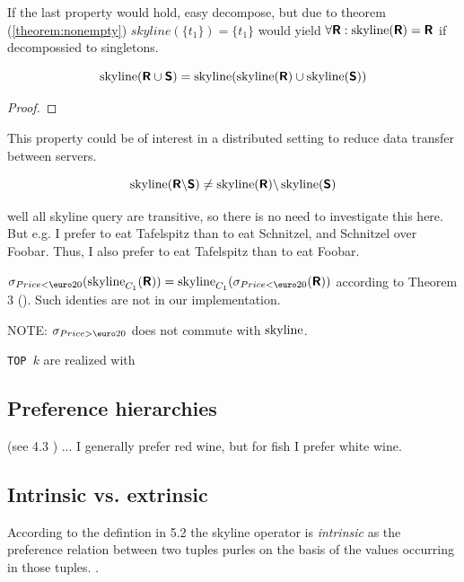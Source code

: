 If the last property would hold, easy decompose, but due to theorem (\ref{theorem:nonempty}) $skyline(\{t_1\}) = \{t_1\}$ would yield $\forall \relation{R} : \skyline(\relation{R}) = \relation{R}$ if decompossied to singletons.

\begin{equation}\label{equ:skyline-decompose}
\skyline(\relation{R} \union \relation{S}) = \skyline(\skyline(\relation R) \union \skyline(\relation S))
\end{equation}
\begin{proof}
\end{proof}

This property could be of interest in a distributed setting to reduce data transfer between servers.


\begin{equation}
\skyline(\relation{R} \difference \relation{S}) \not= \skyline(\relation{R}) \difference \skyline(\relation{S})
\end{equation}


well all skyline query are transitive, so there is no need to investigate this here. But e.g. I prefer to eat Tafelspitz than to eat Schnitzel, and Schnitzel over Foobar. Thus, I also prefer to eat Tafelspitz than to eat Foobar.


$\sigma_{Price<\textnormal{\euro}20}(\skyline_{C_1}(\relation{R}))=\skyline_{C_1}(\sigma_{Price<\textnormal{\euro}20}(\relation{R}))$
according to Theorem 3 (\citep{Chomicki2002}).
Such identies are not in our implementation.

NOTE: $\sigma_{Price>\textnormal{\euro}20}$ does not commute with $\skyline$.


\texttt{TOP $k$} are realized with 

\subsection{Preference hierarchies}
(see 4.3 \citep{Chomicki2002}) ... I generally prefer red wine, but for fish I prefer white wine.


\subsection{Intrinsic vs. extrinsic}
According to the defintion in 5.2 \citep{Chomicki2002} the skyline operator is \emph{intrinsic} as the preference relation between two tuples purles on the basis of the values occurring in those tuples. .

